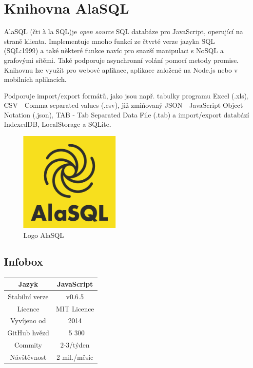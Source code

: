 \documentclass[a4, titlepage]{article}
\begin{document}
\section{Knihovna AlaSQL}
AlaSQL (čti à la SQL)je \textit{open source} SQL databáze pro JavaScript, operující na straně klienta. Implementuje mnoho funkcí ze čtvrté verze jazyka SQL (SQL:1999) a také některé funkce navíc pro snazší manipulaci s NoSQL a grafovými sítěmi. Také podporuje asynchronní volání pomocí metody promise. Knihovnu lze využít pro webové aplikace, aplikace založené na Node.js nebo v mobilních aplikacích.

Podporuje import/export formátů, jako jsou např. tabulky programu Excel (.xls), CSV - Comma-separated values (.csv), již zmiňovaný JSON - JavaScript Object Notation (.json), TAB - Tab Separated Data File (.tab) a import/export databází IndexedDB, LocalStorage a SQLite.

\begin{figure}[h]
    \centering
    \includegraphics[width=5cm]{alasql_logo}
    \caption{Logo AlaSQL}
\end{figure}


\subsection{Infobox}
\begin{center}
\begin{tabular}{ ||c|c|| }
\hline
 Jazyk & JavaScript \\
 \hline
 Stabilní verze & v0.6.5 \\
 \hline
 Licence & MIT Licence \\
 \hline
 Vyvíjeno od & 2014 \\
 \hline
 GitHub hvězd & ~5 300 \\
 \hline
 Commity & 2-3/týden \\
 \hline
 Návštěvnost & 2 mil./měsíc  \\
 \hline
\end{tabular}
\end{center}
\end{document}

